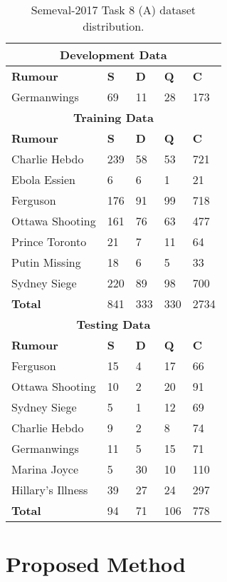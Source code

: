 \documentclass[sigconf]{acmart}
\begin{document}
\begin{table}
\begin{center}
\begin{tabular}{ p{3.1cm} p{0.6cm}p{0.6cm}p{0.6cm}p{0.6cm}  }
 \hline
 \multicolumn{5}{c}{\textbf{Development Data}} \\
 \hline
   \textbf{Rumour} & \textbf{S} & \textbf{D} & \textbf{Q} & \textbf{C}\\
 \hline
 Germanwings & 69 & 11 & 28 & 173\\
 \hline
 \hline
 \multicolumn{5}{c}{\textbf{Training Data}} \\
 \hline
   \textbf{Rumour} & \textbf{S} & \textbf{D} & \textbf{Q} & \textbf{C}\\
 \hline
 Charlie Hebdo & 239 & 58 & 53 & 721\\
 Ebola Essien &  6 & 6 & 1 & 21\\
 Ferguson &  176 & 91 & 99 & 718\\
 Ottawa Shooting &  161 & 76 & 63 & 477\\
 Prince Toronto &  21 & 7 & 11 & 64\\
 Putin Missing &  18 & 6 & 5 & 33\\
 Sydney Siege &  220 & 89 & 98 & 700\\
 \hline
 \textbf{Total} & 841 & 333 & 330 & 2734\\
 \hline
 \hline
 \multicolumn{5}{c}{\textbf{Testing Data}} \\
 \hline
   \textbf{Rumour} & \textbf{S} & \textbf{D} & \textbf{Q} & \textbf{C}\\
 \hline
 Ferguson &  15 & 4 & 17 & 66\\
 Ottawa Shooting &  10 & 2 & 20 & 91\\
 Sydney Siege &  5 & 1 & 12 & 69\\
 Charlie Hebdo &  9 & 2 & 8 & 74\\
 Germanwings &  11 & 5 & 15 & 71\\
 Marina Joyce &  5 & 30 & 10 & 110\\
 Hillary's Illness &  39 & 27 & 24 & 297\\
\hline
 \textbf{Total} & 94 & 71 & 106 & 778\\
\hline
\end{tabular}
\end{center}
\caption{\label{data-distribution} Semeval-2017 Task 8 (A) dataset distribution.}
\end{table}

\section{Proposed Method}
\end{document}
